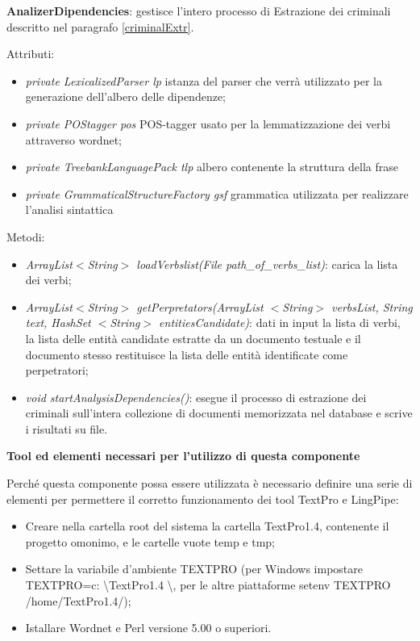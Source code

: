 \textbf{AnalizerDipendencies}: gestisce l'intero processo di Estrazione dei criminali descritto nel paragrafo \ref{criminalExtr}.

Attributi:
\begin{itemize}
	\item \textit{private LexicalizedParser lp} istanza del parser che verrà utilizzato per la generazione dell'albero delle dipendenze;
	\item \textit{private POStagger pos} POS-tagger usato per la lemmatizzazione dei verbi attraverso wordnet;
	\item \textit{private TreebankLanguagePack tlp} albero contenente la struttura della frase
 	\item \textit{private GrammaticalStructureFactory gsf} grammatica utilizzata per realizzare l'analisi sintattica
\end{itemize}

Metodi:
\begin{itemize}
	\item \textit{ArrayList$<$String$>$ loadVerbslist(File path\_of\_verbs\_list)}: carica la lista dei verbi;
	\item \textit{ArrayList$<$String$>$ getPerpretators(ArrayList $<$String$>$ verbsList, String text, HashSet $<$String$>$ entitiesCandidate)}: dati in input la lista di verbi, la lista delle entità candidate estratte da un documento testuale e il documento stesso restituisce la lista delle entità identificate come perpetratori;
	\item \textit{void startAnalysisDependencies()}: esegue il processo di estrazione dei criminali sull'intera collezione di documenti memorizzata nel database e scrive i risultati su file.
\end{itemize}

\textbf{Tool ed elementi necessari per l'utilizzo di questa componente}

Perché questa componente possa essere utilizzata è necessario definire una serie di elementi per permettere il corretto funzionamento dei tool TextPro e LingPipe:
\begin{itemize}
	\item Creare nella cartella root del sistema la cartella TextPro1.4, contenente il progetto omonimo, e le cartelle vuote temp e tmp;
	\item Settare la variabile d'ambiente TEXTPRO (per Windows impostare TEXTPRO=c: \textbackslash TextPro1.4 \textbackslash, per le altre piattaforme setenv TEXTPRO /home/TextPro1.4/);
	\item Istallare Wordnet e Perl versione 5.00 o superiori.
\end{itemize}

